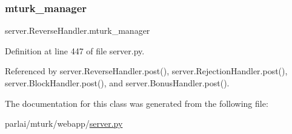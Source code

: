 \subsubsection{\texorpdfstring{mturk\+\_\+manager}{mturk\_manager}}
{\footnotesize\ttfamily server.\+Reverse\+Handler.\+mturk\+\_\+manager}



Definition at line 447 of file server.\+py.



Referenced by server.\+Reverse\+Handler.\+post(), server.\+Rejection\+Handler.\+post(), server.\+Block\+Handler.\+post(), and server.\+Bonus\+Handler.\+post().



The documentation for this class was generated from the following file\+:\begin{DoxyCompactItemize}
\item 
parlai/mturk/webapp/\hyperlink{server_8py}{server.\+py}\end{DoxyCompactItemize}
